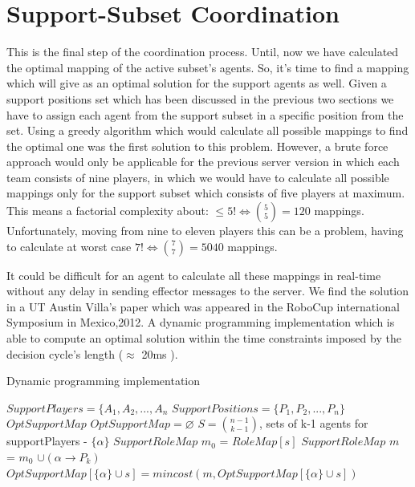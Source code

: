 \section{Support-Subset Coordination}
This is the final step of the coordination process. Until, now we have calculated the optimal mapping of the active subset's agents. So, it's time to find a mapping which will give as an optimal solution for the support agents as well. Given a support positions set which has been discussed in the previous two sections we have to assign each agent from the support subset in a specific position from the set. Using a greedy algorithm which would calculate all possible mappings to find the optimal one was the first solution to this problem. However, a brute force approach would only be applicable for the previous server version in which each team consists of nine players, in which we would have to calculate all possible mappings only for the support subset which consists of five players at maximum. 
This means a factorial complexity about: $\leqslant 5! \Leftrightarrow  {{5}\choose{5}} = 120$ mappings. Unfortunately, moving from nine to eleven  players this can be a problem, having to calculate at worst case $ 7! \Leftrightarrow  {{7}\choose{7}} = 5040$ mappings. 

It could be difficult for an agent to calculate all these mappings in real-time without any delay in sending effector messages to the server. We find the solution in a UT Austin Villa's paper \cite{UtAustinVillaPaper} which was appeared in the RoboCup international Symposium in Mexico,2012. A dynamic programming implementation which is able to compute an optimal solution within the time constraints imposed by the decision cycle's length ($\approx$ 20ms ).

\begin{algorithm}[ht!]
\caption{Dynamic programming implementation \cite{UtAustinVillaPaper}}
\label{alg3}
\begin{algorithmic}[1]
$SupportPlayers = \lbrace A_{1},A_{2},...,A_{n} $
\STATE $SupportPositions = \lbrace P_{1},P_{2},...,P_{n} \rbrace $
$OptSupportMap$
\STATE $OptSupportMap = \varnothing $
\STATE $ S = {{n-1}\choose{k-1}} $, sets of k-1 agents for supportPlayers - $\lbrace \alpha \rbrace$
\STATE $SupportRoleMap$ $m_{0}$ = $RoleMap[s]$
\STATE $SupportRoleMap$ $m$ = $m_{0}$ $ \cup (\alpha \rightarrow P_{k})$
\STATE $OptSupportMap[\lbrace \alpha \rbrace \cup s] = mincost(m,OptSupportMap[\lbrace \alpha \rbrace \cup s])$
\ENDFOR
\ENDFOR
\ENDFOR
\end{algorithmic}
\end{algorithm}


